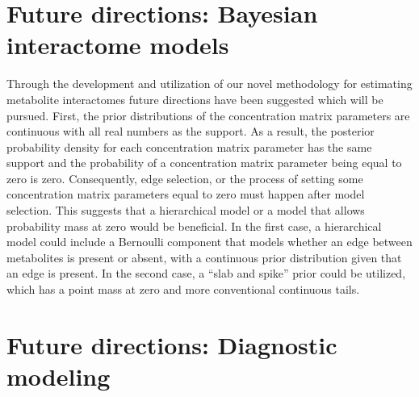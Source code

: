 \begin{DoubleSpace*}
\section{Future directions: Bayesian interactome models}
Through the development and utilization of our novel methodology for estimating metabolite interactomes future directions have been suggested which will be pursued. First, the prior distributions of the concentration matrix parameters are continuous with all real numbers as the support. As a result, the posterior probability density for each concentration matrix parameter has the same support and the probability of a concentration matrix parameter being equal to zero is zero. Consequently, edge selection, or the process of setting some concentration matrix parameters equal to zero must happen after model selection. This suggests that a hierarchical model or a model that allows probability mass at zero would be beneficial. In the first case, a hierarchical model could include a Bernoulli component that models whether an edge between metabolites is present or absent, with a continuous prior distribution given that an edge is present. In the second case, a ``slab and spike'' prior could be utilized, which has a point mass at zero and more conventional continuous tails.

\section{Future directions: Diagnostic modeling}

\end{DoubleSpace*}
